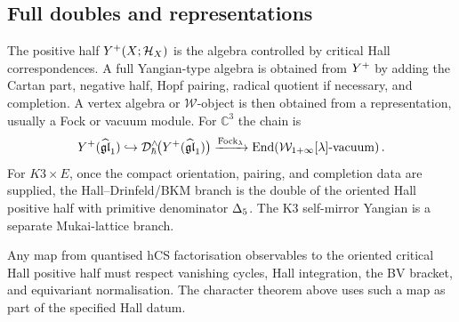 \subsection*{Full doubles and representations}

The positive half \(Y^{+}(X;\mathcal H_X)\) is the algebra controlled by
critical Hall correspondences. A full Yangian-type algebra is obtained
from \(Y^{+}\) by adding the Cartan part, negative half, Hopf pairing,
radical quotient if necessary, and completion. A vertex algebra or
\(\mathcal W\)-object is then obtained from a representation, usually
a Fock or vacuum module. For \(\mathbb C^3\) the chain is
\[
  Y^{+}(\widehat{\mathfrak{gl}}_1)
  \hookrightarrow
  \mathcal D_\hbar^\wedge\!\bigl(Y^{+}(\widehat{\mathfrak{gl}}_1)\bigr)
  \xrightarrow{\mathrm{Fock}_\lambda}
  \mathrm{End}\!\left(\mathcal W_{1+\infty}[\lambda]\text{-vacuum}\right).
\]
For \(K3\times E\), once the compact orientation, pairing, and
completion data are supplied, the Hall--Drinfeld/BKM branch is the
double of the oriented Hall positive half with primitive denominator
\(\Delta_5\). The K3 self-mirror Yangian is a separate Mukai-lattice
branch.

Any map from quantised hCS factorisation observables to the oriented
critical Hall positive half must respect vanishing cycles, Hall
integration, the BV bracket, and equivariant normalisation. The
character theorem above uses such a map as part of the specified Hall
datum.
